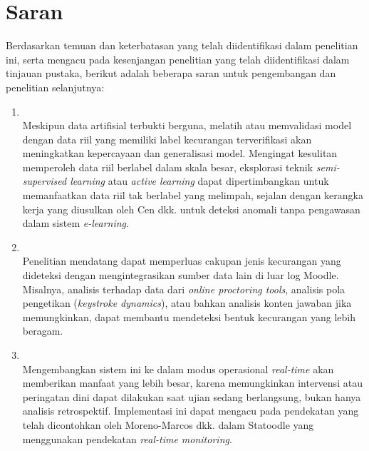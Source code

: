 \section{Saran}
\label{sec:saran_bab5}
Berdasarkan temuan dan keterbatasan yang telah diidentifikasi dalam penelitian ini, serta mengacu pada kesenjangan penelitian yang telah diidentifikasi dalam tinjauan pustaka, berikut adalah beberapa saran untuk pengembangan dan penelitian selanjutnya:
\begin{enumerate}
    \item {} \\
    Meskipun data artifisial terbukti berguna, melatih atau memvalidasi model dengan data riil yang memiliki label kecurangan terverifikasi akan meningkatkan kepercayaan dan generalisasi model. Mengingat kesulitan memperoleh data riil berlabel dalam skala besar, eksplorasi teknik \textit{semi-supervised learning} atau \textit{active learning} dapat dipertimbangkan untuk memanfaatkan data riil tak berlabel yang melimpah, sejalan dengan kerangka kerja yang diusulkan oleh Cen dkk. \cite{survey:anomaly_detection_edu} untuk deteksi anomali tanpa pengawasan dalam sistem \textit{e-learning}.

    \item {} \\
    Penelitian mendatang dapat memperluas cakupan jenis kecurangan yang dideteksi dengan mengintegrasikan sumber data lain di luar log Moodle. Misalnya, analisis terhadap data dari \textit{online proctoring tools}, analisis pola pengetikan (\textit{keystroke dynamics}), atau bahkan analisis konten jawaban jika memungkinkan, dapat membantu mendeteksi bentuk kecurangan yang lebih beragam.

    \item {} \\
    Mengembangkan sistem ini ke dalam modus operasional \textit{real-time} akan memberikan manfaat yang lebih besar, karena memungkinkan intervensi atau peringatan dini dapat dilakukan saat ujian sedang berlangsung, bukan hanya analisis retrospektif. Implementasi ini dapat mengacu pada pendekatan yang telah dicontohkan oleh Moreno-Marcos dkk. \cite{MorenoMarcos2023} dalam Statoodle yang menggunakan pendekatan \textit{real-time monitoring}.


\end{enumerate}
